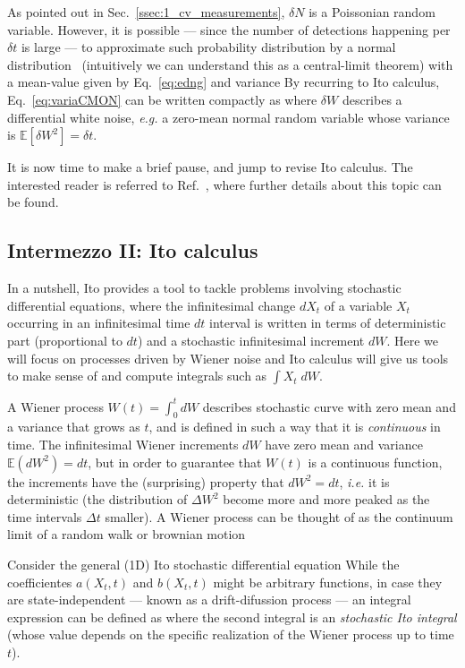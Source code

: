 As pointed out in Sec.~\ref{ssec:1_cv_measurements}, $\delta N$ is a Poissonian random variable. However, it is possible --- since the number of detections happening per $\delta t$ is large --- to approximate such probability distribution by a normal distribution~\cite{wisemanbook,wiseman1993quantum} (intuitively we can understand this as a central-limit theorem) with a mean-value given by Eq.~\ref{eq:edng} and variance
By recurring to Ito calculus, Eq.~\eqref{eq:variaCMON} can be written compactly as
where $\delta W$ describes a differential white noise, \textit{e.g.} a zero-mean normal random variable whose variance is $\mathbb{E}[\delta W^2] = \delta t $.

It is now time to make a brief pause, and jump to revise Ito calculus. The interested reader is referred to Ref.~\cite{gardiner2004handbook}, where further details about this topic can be found.

\subsection{Intermezzo II: Ito calculus}\label{ssec:ito}
In a nutshell, Ito provides a tool to tackle problems involving stochastic differential equations,
where the infinitesimal change $dX_{t}$ of a variable $X_{t}$ occurring in an infinitesimal time $dt$ interval is written in terms of deterministic part (proportional to $dt$) and a stochastic infinitesimal increment $dW$.
Here we will focus on processes driven by Wiener noise and Ito calculus will give us tools to make sense of and compute integrals such as $\int X_{t} \; dW$.

A Wiener process $W(t)=\int_{0}^{t}dW$ describes stochastic curve
with zero mean and a variance that grows as $t$, and is defined in such a way that it is \emph{continuous} in time. The infinitesimal Wiener increments $dW$ have zero mean and variance $\mathbb{E}({dW^{2}})=dt$, but in order to guarantee that $W(t)$  is a continuous function, the increments have the (surprising) property that $dW^2=dt$, \textit{i.e.} it is deterministic (the distribution of $\Delta W^2$ become more and more peaked as the time intervals $\Delta t$ smaller). A Wiener process can be thought of as the continuum limit of a random walk or brownian motion

Consider the general (1D) Ito stochastic differential equation
While the coefficientes $a(X_t,t)$ and $b(X_t,t)$ might be arbitrary functions, in case they are state-independent --- known as a drift-difussion process --- an integral expression can be defined as
where the second integral is an \textit{stochastic Ito integral} (whose value depends on the specific realization of the Wiener process up to time $t$).

